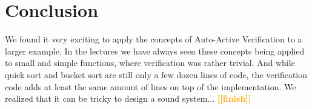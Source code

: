 \documentclass{report}
\newcommand{\todo}[1]{\textsf{\textbf{\textcolor{orange}{[[#1]]}}}}
\begin{document}
\section{Conclusion}
\label{s:conclusion}
We found it very exciting to apply the concepts of Auto-Active Verification to a larger example. In the lectures we have always seen these concepts being applied to small and simple functions, where verification was rather trivial. And while quick sort and bucket sort are still only a few dozen lines of code, the verification code adds at least the same amount of lines on top of the implementation.
We realized that it can be tricky to design a sound system...
\todo{finish}





\end{document}
